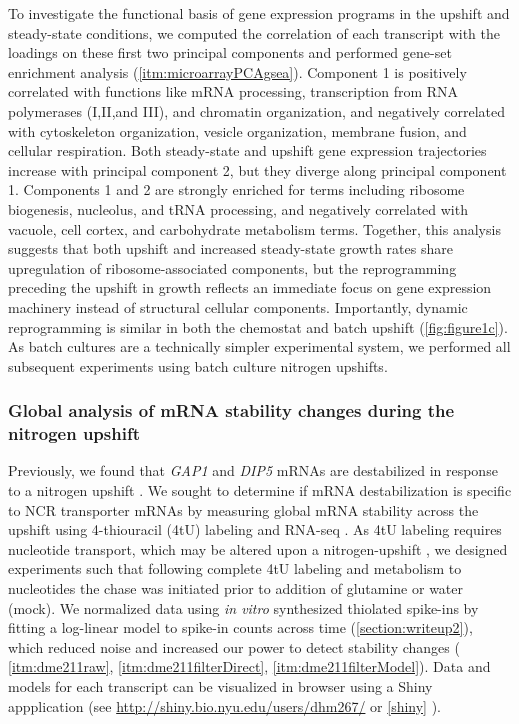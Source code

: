 To investigate the functional basis of gene expression programs
in the upshift and steady-state conditions, we computed the
correlation of each transcript with the loadings on these first two
principal components and performed gene-set enrichment analysis
(\autoref{itm:microarrayPCAgsea}). 
Component 1 is positively correlated with functions like
mRNA processing, transcription from RNA polymerases (I,II,and III),
and chromatin organization, and negatively correlated with
cytoskeleton organization,
vesicle organization, membrane fusion, and cellular respiration.
Both steady-state and upshift gene expression
trajectories increase with principal component 2, but they diverge
along principal component 1. Components 1 and 2 are 
strongly enriched for terms including ribosome biogenesis, 
nucleolus, and
tRNA processing, and negatively correlated with
vacuole, cell cortex, and carbohydrate metabolism terms. 
Together, this analysis suggests that both upshift and
increased steady-state growth rates share upregulation of
ribosome-associated components, but the reprogramming
preceding the upshift in growth reflects an immediate focus on 
gene expression machinery instead of structural cellular components.
Importantly,
dynamic reprogramming is similar in both the chemostat and batch
upshift (\autoref{fig:figure1c}). As batch cultures are a technically
simpler experimental system, we performed all subsequent experiments
using batch culture nitrogen upshifts. 

\subsubsection{Global analysis of mRNA stability changes during the
nitrogen upshift}

Previously, we found that \textit{GAP1} and \textit{DIP5} mRNAs 
are destabilized in
response to a nitrogen upshift \parencite{airoldi2016steady}. We sought to
determine if mRNA destabilization is specific to NCR transporter
mRNAs by measuring global mRNA stability across the upshift
using 4-thiouracil (4tU) labeling and RNA-seq 
\parencite{neymotin2014determination,munchel2011dynamic}.
As 4tU labeling requires nucleotide transport, which may be altered
upon a nitrogen-upshift \parencite{hein1995npi1}, we designed experiments such
that following complete 4tU labeling and metabolism to nucleotides 
the chase was initiated prior to addition of glutamine or water (mock).
We normalized data using \textit{in vitro} synthesized thiolated 
spike-ins by fitting a log-linear model to spike-in counts
across time (\autoref{section:writeup2}), which reduced noise and increased
our power to detect stability changes (
\autoref{itm:dme211raw},
\autoref{itm:dme211filterDirect},
\autoref{itm:dme211filterModel}).
Data and models for each transcript can be visualized in browser
using a Shiny appplication (see
\url{http://shiny.bio.nyu.edu/users/dhm267/} or \autoref{shiny} ). 

